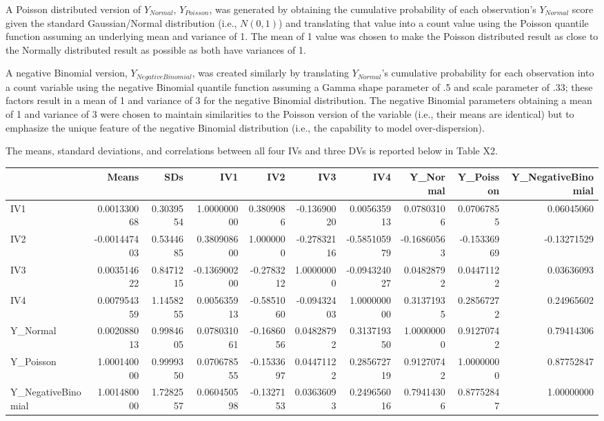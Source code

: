 \documentclass[ShortAfour,times,sageapa]{sagej}
\begin{document}
	A Poisson distributed version of $Y_{Normal}$, $Y_{Poisson}$, was generated by obtaining the cumulative probability of each observation's $Y_{Normal}$ score given the standard Gaussian/Normal distribution (i.e., $N(0,1)$) and translating that value into a count value using the Poisson quantile function assuming an underlying mean and variance of 1.  
	The mean of 1 value was chosen to make the Poisson distributed result as close to the Normally distributed result as possible as both have variances of 1.	
	
	A negative Binomial version, $Y_{NegativeBinomial}$, was created similarly by translating $Y_{Normal}$'s cumulative probability for each observation into a count variable using the negative Binomial quantile function assuming a Gamma shape parameter of .5 and scale parameter of .33; these factors result in a mean of 1 and variance of 3 for the negative Binomial distribution.  
	The negative Binomial parameters obtaining a mean of 1 and variance of 3 were chosen to maintain similarities to the Poisson version of the variable (i.e., their means are identical) but to emphasize the unique feature of the negative Binomial distribution (i.e., the capability to model over-dispersion).  
	
	The means, standard deviations, and correlations between all four IVs and three DVs is reported below in Table X2.
	
	\begin{longtable}{l|rr|rrrrrrr}
		\toprule
		\multicolumn{1}{l}{} & Means & SDs & IV1 & IV2 & IV3 & IV4 & Y\_Normal & Y\_Poisson & Y\_NegativeBinomial \\ 
		\midrule
		IV1 & 0.001330068 & 0.3039554 & 1.000000000 & 0.3809086 & -0.13690020 & 0.005635913 & 0.07803106 & 0.07067855 & 0.06045060 \\ 
		IV2 & -0.001447403 & 0.5344685  & 0.380908600 & 1.0000000 & -0.27832116 & -0.585105979 & -0.16860563 & -0.15336969 & -0.13271529 \\ 
		IV3 & 0.003514622 & 0.8471215 & -0.136900200 & -0.2783212 & 1.00000000 & -0.094324027 & 0.04828792 & 0.04471122 & 0.03636093 \\ 
		IV4 & 0.007954359 & 1.1458255 & 0.005635913 & -0.5851060 & -0.09432403 & 1.000000000 & 0.31371935 & 0.28567272 & 0.24965602 \\ 
		Y\_Normal & 0.002088013 & 0.9984605 & 0.078031061 & -0.1686056 & 0.04828792 & 0.313719350 & 1.00000000 & 0.91270742 & 0.79414306 \\ 
		Y\_Poisson & 1.000140000 & 0.9999350 & 0.070678555 & -0.1533697 & 0.04471122 & 0.285672719 & 0.91270742 & 1.00000000 & 0.87752847 \\ 
		Y\_NegativeBinomial & 1.001480000 & 1.7282557 & 0.060450598 & -0.1327153 & 0.03636093 & 0.249656016 & 0.79414306 & 0.87752847 & 1.00000000 \\ 
		\bottomrule
	\end{longtable}
\end{document}
